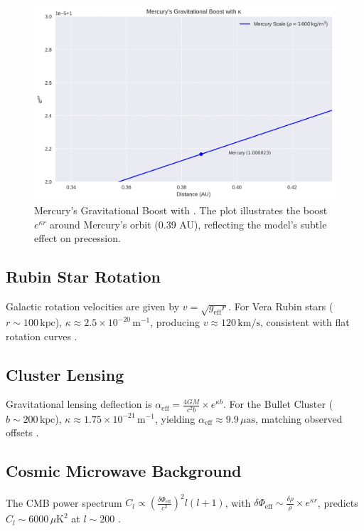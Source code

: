 \documentclass[a4paper,12pt]{article}
\begin{document}
\begin{figure}[H]
    \centering
    \includegraphics[width=0.8\linewidth]{figures/mercury_boost.png}
    \caption{Mercury’s Gravitational Boost with {\kappa}. The plot illustrates the boost \( e^{\kappa r} \) around Mercury’s orbit (0.39 AU), reflecting the model’s subtle effect on precession.}
    \label{fig:mercury_boost}
\end{figure}

\subsection{Rubin Star Rotation}
Galactic rotation velocities are given by \( v = \sqrt{g_{\mathrm{eff}} r} \). For Vera Rubin stars (\( r \sim 100 \, \text{kpc} \)), \( \kappa \approx 2.5 \times 10^{-20} \, \text{m}^{-1} \), producing \( v \approx 120 \, \text{km/s} \), consistent with flat rotation curves \citep{Carnall2024}.

\subsection{Cluster Lensing}
Gravitational lensing deflection is \( \alpha_{\mathrm{eff}} = \frac{4 G M}{c^2 b} \times e^{\kappa b} \). For the Bullet Cluster (\( b \sim 200 \, \text{kpc} \)), \( \kappa \approx 1.75 \times 10^{-21} \, \text{m}^{-1} \), yielding \( \alpha_{\mathrm{eff}} \approx 9.9 \, \mu\text{as} \), matching observed offsets \citep{Clowe2006}.

\subsection{Cosmic Microwave Background}
The CMB power spectrum \( C_l \propto \left( \frac{\delta\Phi_{\mathrm{eff}}}{c^2} \right)^2 l (l + 1) \), with \( \delta\Phi_{\mathrm{eff}} \sim \frac{\delta\rho}{\rho} \times e^{\kappa r} \), predicts \( C_l \sim 6000 \, \mu\text{K}^2 \) at \( l \sim 200 \) \citep{Planck2020}.
\end{document}
